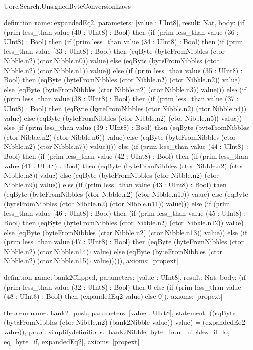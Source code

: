 \begin{lexlean}{Uorc.Search.UnsignedByteConversionLaws}
\begin{semanticmodule}
definition{
  name: expandedEq2,
  parameters: [value : UInt8],
  result: Nat,
  body: (if (prim less_than value (40 : UInt8) : Bool) then (if (prim less_than value (36 : UInt8) : Bool) then (if (prim less_than value (34 : UInt8) : Bool) then (if (prim less_than value (33 : UInt8) : Bool) then (eqByte (byteFromNibbles (ctor Nibble.n2) (ctor Nibble.n0)) value) else (eqByte (byteFromNibbles (ctor Nibble.n2) (ctor Nibble.n1)) value)) else (if (prim less_than value (35 : UInt8) : Bool) then (eqByte (byteFromNibbles (ctor Nibble.n2) (ctor Nibble.n2)) value) else (eqByte (byteFromNibbles (ctor Nibble.n2) (ctor Nibble.n3)) value))) else (if (prim less_than value (38 : UInt8) : Bool) then (if (prim less_than value (37 : UInt8) : Bool) then (eqByte (byteFromNibbles (ctor Nibble.n2) (ctor Nibble.n4)) value) else (eqByte (byteFromNibbles (ctor Nibble.n2) (ctor Nibble.n5)) value)) else (if (prim less_than value (39 : UInt8) : Bool) then (eqByte (byteFromNibbles (ctor Nibble.n2) (ctor Nibble.n6)) value) else (eqByte (byteFromNibbles (ctor Nibble.n2) (ctor Nibble.n7)) value)))) else (if (prim less_than value (44 : UInt8) : Bool) then (if (prim less_than value (42 : UInt8) : Bool) then (if (prim less_than value (41 : UInt8) : Bool) then (eqByte (byteFromNibbles (ctor Nibble.n2) (ctor Nibble.n8)) value) else (eqByte (byteFromNibbles (ctor Nibble.n2) (ctor Nibble.n9)) value)) else (if (prim less_than value (43 : UInt8) : Bool) then (eqByte (byteFromNibbles (ctor Nibble.n2) (ctor Nibble.n10)) value) else (eqByte (byteFromNibbles (ctor Nibble.n2) (ctor Nibble.n11)) value))) else (if (prim less_than value (46 : UInt8) : Bool) then (if (prim less_than value (45 : UInt8) : Bool) then (eqByte (byteFromNibbles (ctor Nibble.n2) (ctor Nibble.n12)) value) else (eqByte (byteFromNibbles (ctor Nibble.n2) (ctor Nibble.n13)) value)) else (if (prim less_than value (47 : UInt8) : Bool) then (eqByte (byteFromNibbles (ctor Nibble.n2) (ctor Nibble.n14)) value) else (eqByte (byteFromNibbles (ctor Nibble.n2) (ctor Nibble.n15)) value))))),
  axioms: [propext]
}

definition{
  name: bank2Clipped,
  parameters: [value : UInt8],
  result: Nat,
  body: (if (prim less_than value (32 : UInt8) : Bool) then 0 else (if (prim less_than value (48 : UInt8) : Bool) then (expandedEq2 value) else 0)),
  axioms: [propext]
}

theorem{
  name: bank2_push,
  parameters: [value : UInt8],
  statement: ((eqByte (byteFromNibbles (ctor Nibble.n2) (bank2Nibble value)) value) = (expandedEq2 value)),
  proof: simplify{definitions: [bank2Nibble, byte_from_nibbles_if_lo, eq_byte_if, expandedEq2]},
  axioms: [propext]
}


\end{semanticmodule}
\end{lexlean}
